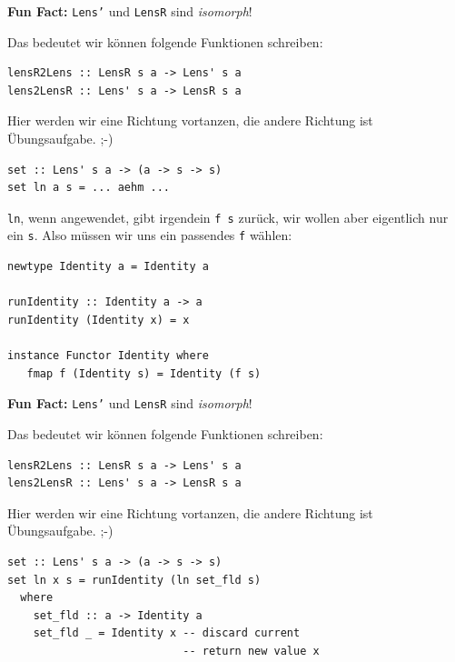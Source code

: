 \documentclass{beamer}
\begin{document}

\begin{frame}[fragile]

\textbf{Fun Fact:} \texttt{Lens'} und \texttt{LensR} sind \emph{isomorph}!
\pause
\smallskip\smallskip

Das bedeutet wir können folgende Funktionen schreiben:

\begin{verbatim}
lensR2Lens :: LensR s a -> Lens' s a
lens2LensR :: Lens' s a -> LensR s a
\end{verbatim}
\pause

Hier werden wir eine Richtung vortanzen, die andere Richtung ist Übungsaufgabe. ;-)

\begin{verbatim}
set :: Lens' s a -> (a -> s -> s)
set ln a s = ... aehm ...
\end{verbatim}
\pause

\texttt{ln}, wenn angewendet, gibt irgendein \texttt{f s} zurück, wir wollen aber eigentlich nur ein \texttt{s}. \pause
Also müssen wir uns ein passendes \texttt{f} wählen:

\begin{verbatim}
newtype Identity a = Identity a

runIdentity :: Identity a -> a 
runIdentity (Identity x) = x

instance Functor Identity where
   fmap f (Identity s) = Identity (f s)
\end{verbatim}
 
\end{frame}


\begin{frame}[fragile]

\textbf{Fun Fact:} \texttt{Lens'} und \texttt{LensR} sind \emph{isomorph}!
\smallskip\smallskip

Das bedeutet wir können folgende Funktionen schreiben:

\begin{verbatim}
lensR2Lens :: LensR s a -> Lens' s a
lens2LensR :: Lens' s a -> LensR s a
\end{verbatim}

Hier werden wir eine Richtung vortanzen, die andere Richtung ist Übungsaufgabe. ;-)

\begin{verbatim}
set :: Lens' s a -> (a -> s -> s)
set ln x s = runIdentity (ln set_fld s)
  where
    set_fld :: a -> Identity a
    set_fld _ = Identity x -- discard current
                           -- return new value x
\end{verbatim}
\end{frame}
\end{document}
